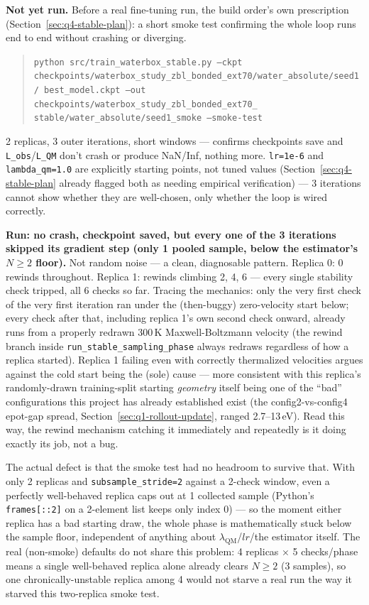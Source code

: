 \documentclass[11pt]{article}
\begin{document}
\textbf{Not yet run.} Before a real fine-tuning run, the build order's own
prescription (Section~\ref{sec:q4-stable-plan}): a short smoke test
confirming the whole loop runs end to end without crashing or diverging.
\begin{quote}
\texttt{python src/train\_waterbox\_stable.py --ckpt
checkpoints/waterbox\_study\_zbl\_bonded\_ext70/water\_absolute/seed1/
best\_model.ckpt --out checkpoints/waterbox\_study\_zbl\_bonded\_ext70\_
stable/water\_absolute/seed1\_smoke --smoke-test}
\end{quote}
2 replicas, 3 outer iterations, short windows --- confirms checkpoints
save and \texttt{L\_obs}/\texttt{L\_QM} don't crash or produce
NaN/Inf, nothing more. \texttt{lr=1e{-}6} and \texttt{lambda\_qm=1.0} are
explicitly starting points, not tuned values (Section~\ref{sec:q4-stable-plan}
already flagged both as needing empirical verification) --- 3 iterations
cannot show whether they are well-chosen, only whether the loop is wired
correctly.

\textbf{Run: no crash, checkpoint saved, but every one of the 3 iterations
skipped its gradient step (only 1 pooled sample, below the estimator's
$N{\ge}2$ floor).} Not random noise --- a clean, diagnosable pattern.
Replica 0: 0 rewinds throughout. Replica 1: rewinds climbing 2, 4, 6 ---
every single stability check tripped, all 6 checks so far. Tracing the
mechanics: only the very first check of the very first iteration ran under
the (then-buggy) zero-velocity start below; every check after that,
including replica 1's own second check onward, already runs from a
properly redrawn 300\,K Maxwell-Boltzmann velocity (the rewind branch
inside \texttt{run\_stable\_sampling\_phase} always redraws regardless of
how a replica started). Replica 1 failing even with correctly thermalized
velocities argues against the cold start being the (sole) cause --- more
consistent with this replica's randomly-drawn training-split starting
\emph{geometry} itself being one of the ``bad'' configurations this
project has already established exist (the config2-vs-config4 epot-gap
spread, Section~\ref{sec:q1-rollout-update}, ranged 2.7--13\,eV). Read this
way, the rewind mechanism catching it immediately and repeatedly is it
doing exactly its job, not a bug.

The actual defect is that the smoke test had no headroom to survive that.
With only 2 replicas and \texttt{subsample\_stride=2} against a 2-check
window, even a perfectly well-behaved replica caps out at 1 collected
sample (Python's \texttt{frames[::2]} on a 2-element list keeps only index
0) --- so the moment either replica has a bad starting draw, the whole
phase is mathematically stuck below the sample floor, independent of
anything about $\lambda_{\text{QM}}$/$lr$/the estimator itself. The real
(non-smoke) defaults do not share this problem: 4 replicas $\times$ 5
checks/phase means a single well-behaved replica alone already clears
$N{\ge}2$ (3 samples), so one chronically-unstable replica among 4 would
not starve a real run the way it starved this two-replica smoke test.
\end{document}
